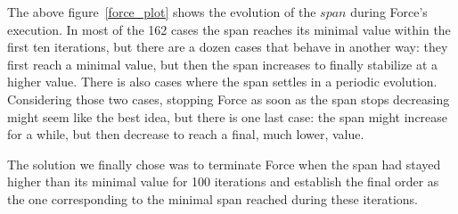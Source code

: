 \documentclass[12pt]{report}
\begin{document}
The above figure~\ref{force_plot} shows the evolution of the $span$ during Force's execution. In most of the 162 cases the span reaches its minimal value within the first ten iterations, but there are a dozen cases that behave in another way: they first reach a minimal value, but then the span increases to finally stabilize at a higher value. There is also cases where the span settles in a periodic evolution.
Considering those two cases, stopping Force as soon as the span stops decreasing might seem like the best idea, but there is one last case: the span might increase for a while, but then decrease to reach a final, much lower, value.

The solution we finally chose was to terminate Force when the span had stayed higher than its minimal value for 100 iterations and establish the final order as the one corresponding to the minimal span reached during these iterations.
\end{document}

